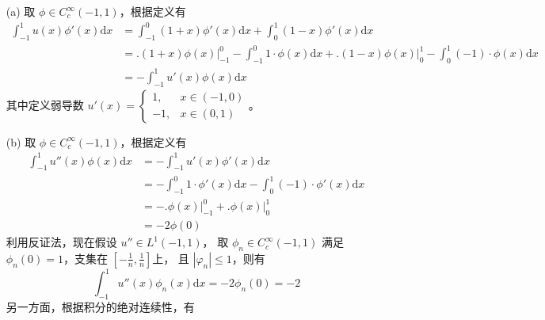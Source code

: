 \documentclass[a4paper]{article}
\begin{document}
\begin{enumerate}
    \item[(a)] 取 $\phi \in C_c^{\infty}(-1,1)$，根据定义有
            \begin{equation}
                \begin{aligned}
                    \int_{-1}^{1} u(x) \phi'(x) \text{d}x
                    &= \int_{-1}^{0} (1+x) \phi'(x) \text{d}x + \int_{0}^{1} (1-x) \phi'(x) \text{d}x\\
                    &= \Big. (1+x) \phi(x) \Big|_{-1}^{0} - \int_{-1}^{0}1\cdot \phi(x) \text{d}x + \Big. (1-x) \phi(x) \Big|_{0}^{1} - \int_{0}^{1}(-1)\cdot \phi(x) \text{d}x\\
                    &= -\int_{-1}^{1}u'(x)\phi(x) \text{d}x    
                \end{aligned}
            \end{equation}
    其中定义弱导数 $u'(x) = \begin{cases}1, & x \in (-1,0)\\ -1, & x \in (0,1)\end{cases}$。
    \item[(b)] 取 $\phi \in C_c^{\infty}(-1,1)$，根据定义有
            \begin{equation}
                \begin{aligned}
                    \int_{-1}^{1} u''(x) \phi(x) \text{d}x
                    &= -\int_{-1}^{1} u'(x) \phi'(x) \text{d}x\\
                    &= -\int_{-1}^{0} 1 \cdot \phi'(x) \text{d}x - \int_{0}^{1} (-1) \cdot \phi'(x) \text{d}x\\
                    &= -\Big. \phi(x) \Big|_{-1}^{0} + \Big. \phi(x) \Big|_{0}^{1}\\
                    &= -2\phi(0)
                \end{aligned}
            \end{equation}
            利用反证法，现在假设 $u'' \in L^1(-1,1)$，
            取 $\phi_n \in C_c^{\infty}(-1,1)$ 满足 
            $\phi_n(0)=1$，支集在 $[-\frac{1}{n},\frac{1}{n}]$上，
            且 $|\varphi_n|\leq 1$，则有
            \begin{equation}
                \int_{-1}^{1} u''(x) \phi_n(x) \text{d}x
                = - 2\phi_n(0)
                = -2
            \end{equation}
            另一方面，根据积分的绝对连续性，有  
            \begin{equation}
                \begin{aligned}

\end{aligned}
\end{equation}
\end{enumerate}
\end{document}
